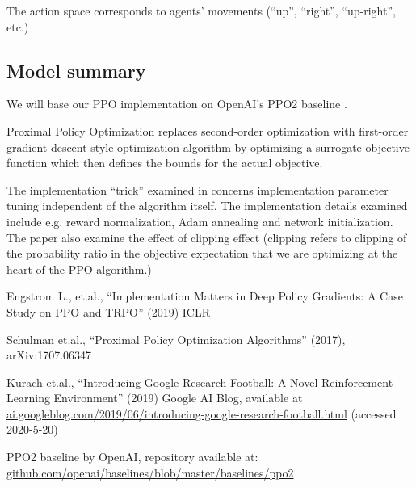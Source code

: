 The action space corresponds to agents' movements (``up'', ``right'', ``up-right'', etc.)

\subsection*{Model summary}\label{section_model}

We will base our PPO implementation on OpenAI's PPO2 baseline \cite{ppo2}.

Proximal Policy Optimization replaces second-order optimization with first-order gradient descent-style optimization algorithm by optimizing a surrogate objective function which then defines the bounds for the actual objective. 

The implementation ``trick'' examined in \cite{engstrom} concerns implementation parameter tuning independent of the algorithm itself. The implementation details examined include e.g. reward normalization, Adam annealing and network initialization. The paper also examine the effect of clipping effect (clipping refers to clipping of the probability ratio in the objective expectation that we are optimizing at the heart of the PPO algorithm.)  


\begin{thebibliography}{10}
Engstrom L., et.al., ``Implementation Matters in Deep Policy Gradients: A Case Study on PPO and TRPO'' (2019) ICLR

Schulman et.al., ``Proximal Policy Optimization Algorithms'' (2017), arXiv:1707.06347

Kurach et.al., ``Introducing Google Research Football: A Novel Reinforcement Learning Environment'' (2019) Google AI Blog, available at \url{ai.googleblog.com/2019/06/introducing-google-research-football.html} (accessed 2020-5-20)

PPO2 baseline by OpenAI, repository available at: \url{github.com/openai/baselines/blob/master/baselines/ppo2}

\end{thebibliography}



